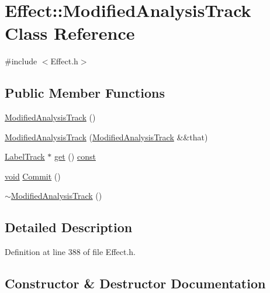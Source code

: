 \hypertarget{class_effect_1_1_modified_analysis_track}{}\section{Effect\+:\+:Modified\+Analysis\+Track Class Reference}
\label{class_effect_1_1_modified_analysis_track}


{\ttfamily \#include $<$Effect.\+h$>$}

\subsection*{Public Member Functions}
\begin{DoxyCompactItemize}
\item 
\hyperlink{class_effect_1_1_modified_analysis_track_a6c0cd940e14805fea9a145688a0f479d}{Modified\+Analysis\+Track} ()
\item 
\hyperlink{class_effect_1_1_modified_analysis_track_a585b25a6b2e8cb0f6bc1827e0ba714f9}{Modified\+Analysis\+Track} (\hyperlink{class_effect_1_1_modified_analysis_track}{Modified\+Analysis\+Track} \&\&that)
\item 
\hyperlink{class_label_track}{Label\+Track} $\ast$ \hyperlink{class_effect_1_1_modified_analysis_track_a8bb54343123bd0174069a00f4b4b7c30}{get} () \hyperlink{getopt1_8c_a2c212835823e3c54a8ab6d95c652660e}{const} 
\item 
\hyperlink{sound_8c_ae35f5844602719cf66324f4de2a658b3}{void} \hyperlink{class_effect_1_1_modified_analysis_track_a632ce20b064e1a4ebf16c02c30a78ccf}{Commit} ()
\item 
\hyperlink{class_effect_1_1_modified_analysis_track_af93069a3b149779dff17f2e819dac890}{$\sim$\+Modified\+Analysis\+Track} ()
\end{DoxyCompactItemize}


\subsection{Detailed Description}


Definition at line 388 of file Effect.\+h.



\subsection{Constructor \& Destructor Documentation}
